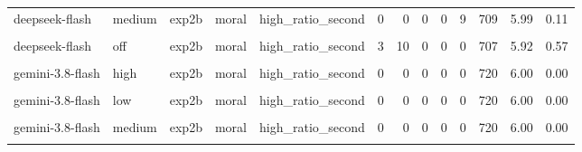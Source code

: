 \documentclass[
]{article}
\begin{document}
\begin{table}[!h]
{\begin{tabular}[t]{lllllrrrrrrrr}
deepseek-flash & medium & exp2b & moral & high\_ratio\_second & 0 & 0 & 0 & 0 & 9 & 709 & 5.99 & 0.11\\
\cellcolor{gray!10}{deepseek-flash} & \cellcolor{gray!10}{off} & \cellcolor{gray!10}{exp2b} & \cellcolor{gray!10}{moral} & \cellcolor{gray!10}{high\_ratio\_first} & \cellcolor{gray!10}{0} & \cellcolor{gray!10}{10} & \cellcolor{gray!10}{0} & \cellcolor{gray!10}{0} & \cellcolor{gray!10}{0} & \cellcolor{gray!10}{710} & \cellcolor{gray!10}{5.94} & \cellcolor{gray!10}{0.47}\\
deepseek-flash & off & exp2b & moral & high\_ratio\_second & 3 & 10 & 0 & 0 & 0 & 707 & 5.92 & 0.57\\
\addlinespace
\cellcolor{gray!10}{gemini-3.8-flash} & \cellcolor{gray!10}{high} & \cellcolor{gray!10}{exp2b} & \cellcolor{gray!10}{moral} & \cellcolor{gray!10}{high\_ratio\_first} & \cellcolor{gray!10}{0} & \cellcolor{gray!10}{0} & \cellcolor{gray!10}{0} & \cellcolor{gray!10}{0} & \cellcolor{gray!10}{0} & \cellcolor{gray!10}{715} & \cellcolor{gray!10}{6.00} & \cellcolor{gray!10}{0.00}\\
gemini-3.8-flash & high & exp2b & moral & high\_ratio\_second & 0 & 0 & 0 & 0 & 0 & 720 & 6.00 & 0.00\\
\cellcolor{gray!10}{gemini-3.8-flash} & \cellcolor{gray!10}{low} & \cellcolor{gray!10}{exp2b} & \cellcolor{gray!10}{moral} & \cellcolor{gray!10}{high\_ratio\_first} & \cellcolor{gray!10}{0} & \cellcolor{gray!10}{0} & \cellcolor{gray!10}{0} & \cellcolor{gray!10}{0} & \cellcolor{gray!10}{0} & \cellcolor{gray!10}{715} & \cellcolor{gray!10}{6.00} & \cellcolor{gray!10}{0.00}\\
gemini-3.8-flash & low & exp2b & moral & high\_ratio\_second & 0 & 0 & 0 & 0 & 0 & 720 & 6.00 & 0.00\\
\cellcolor{gray!10}{gemini-3.8-flash} & \cellcolor{gray!10}{medium} & \cellcolor{gray!10}{exp2b} & \cellcolor{gray!10}{moral} & \cellcolor{gray!10}{high\_ratio\_first} & \cellcolor{gray!10}{0} & \cellcolor{gray!10}{0} & \cellcolor{gray!10}{0} & \cellcolor{gray!10}{0} & \cellcolor{gray!10}{0} & \cellcolor{gray!10}{716} & \cellcolor{gray!10}{6.00} & \cellcolor{gray!10}{0.00}\\
\addlinespace
gemini-3.8-flash & medium & exp2b & moral & high\_ratio\_second & 0 & 0 & 0 & 0 & 0 & 720 & 6.00 & 0.00\\
\cellcolor{gray!10}{gpt-6-luna} & \cellcolor{gray!10}{high} & \cellcolor{gray!10}{exp2b} & \cellcolor{gray!10}{moral} & \cellcolor{gray!10}{high\_ratio\_first} & \cellcolor{gray!10}{0} & \cellcolor{gray!10}{0} & \cellcolor{gray!10}{0} & \cellcolor{gray!10}{0} & \cellcolor{gray!10}{1} & \cellcolor{gray!10}{719} & \cellcolor{gray!10}{6.00} & \cellcolor{gray!10}{0.04}\\

\end{tabular}}
\end{table}
\end{document}
